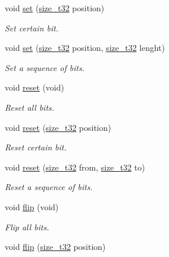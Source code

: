 \begin{DoxyCompactItemize}
void \hyperlink{classcrap_1_1bit__mask_a9f95a363169039cdb533c181d85bc49b}{set} (\hyperlink{types_8h_a38c0a12279ffe0fabec44939e753c914}{size\-\_\-t32} position)
\begin{DoxyCompactList}\small\item\em Set certain bit. \end{DoxyCompactList}\item 
void \hyperlink{classcrap_1_1bit__mask_ac2828001b93909ba2b06fc6b07adb80b}{set} (\hyperlink{types_8h_a38c0a12279ffe0fabec44939e753c914}{size\-\_\-t32} position, \hyperlink{types_8h_a38c0a12279ffe0fabec44939e753c914}{size\-\_\-t32} lenght)
\begin{DoxyCompactList}\small\item\em Set a sequence of bits. \end{DoxyCompactList}\item 
void \hyperlink{classcrap_1_1bit__mask_a9d7b377eb7d3670b0e963cd52497f7d1}{reset} (void)
\begin{DoxyCompactList}\small\item\em Reset all bits. \end{DoxyCompactList}\item 
void \hyperlink{classcrap_1_1bit__mask_af50dad3c4821620d5687e872bb8bdcbe}{reset} (\hyperlink{types_8h_a38c0a12279ffe0fabec44939e753c914}{size\-\_\-t32} position)
\begin{DoxyCompactList}\small\item\em Reset certain bit. \end{DoxyCompactList}\item 
void \hyperlink{classcrap_1_1bit__mask_acf56c913e8affc9bf2399e03fff62ef5}{reset} (\hyperlink{types_8h_a38c0a12279ffe0fabec44939e753c914}{size\-\_\-t32} from, \hyperlink{types_8h_a38c0a12279ffe0fabec44939e753c914}{size\-\_\-t32} to)
\begin{DoxyCompactList}\small\item\em Reset a sequence of bits. \end{DoxyCompactList}\item 
void \hyperlink{classcrap_1_1bit__mask_acf780848977ef45517e0ecc5063d5231}{flip} (void)
\begin{DoxyCompactList}\small\item\em Flip all bits. \end{DoxyCompactList}\item 
void \hyperlink{classcrap_1_1bit__mask_a6d34bf0c472f5547febefcf68baab095}{flip} (\hyperlink{types_8h_a38c0a12279ffe0fabec44939e753c914}{size\-\_\-t32} position)

\end{DoxyCompactItemize}
